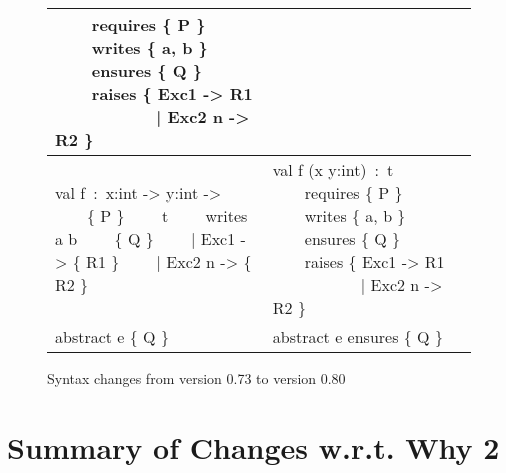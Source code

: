 \documentclass[a4paper,11pt,twoside,openright]{memoir}
\makeatletter
\let\ttfamily\relax
\DeclareRobustCommand\ttfamily
   {\not@math@alphabet\ttfamily\mathtt\fontfamily\ttdefault\selectfont\frenchspacing}
\makeatother
\begin{document}
\begin{figure}[thbp]
\begin{tabular}{|p{}|p{}|}
\null~~~~requires \{ P \} \newline
\null~~~~writes \{ a, b \} \newline
\null~~~~ensures \{ Q \} \newline
\null~~~~raises \{ Exc1 -> R1 \newline
\null~~~~~~~~~~~| Exc2 n -> R2 \}
\\
\hline
\ttfamily
val f~:~x:int -> y:int ->\newline
\null~~~~\{ P \} \newline
\null~~~~t \newline
\null~~~~writes a b \newline
\null~~~~\{ Q \} \newline
\null~~~~| Exc1 -> \{ R1 \} \newline
\null~~~~| Exc2 n -> \{ R2 \}
&
\ttfamily
val f (x y:int)~:~t \newline
\null~~~~requires \{ P \} \newline
\null~~~~writes \{ a, b \} \newline
\null~~~~ensures \{ Q \} \newline
\null~~~~raises \{ Exc1 -> R1 \newline
\null~~~~~~~~~~~| Exc2 n -> R2 \}
\\
\hline
\ttfamily
abstract e \{ Q \}
&
\ttfamily
abstract e ensures \{ Q \}
\\
\hline
\end{tabular}
\caption{Syntax changes from version 0.73 to version 0.80}
\label{fig:syntax-0.80}
\end{figure}

\section{Summary of Changes w.r.t. Why 2}
\end{document}
